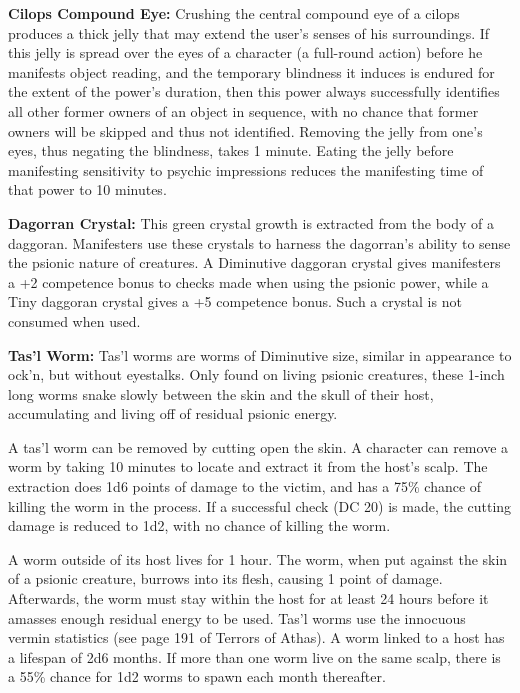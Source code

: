 \textbf{Cilops Compound Eye:} Crushing the central compound eye of a cilops produces a thick jelly that may extend the user's senses of his surroundings. If this jelly is spread over the eyes of a character (a full-round action) before he manifests object reading, and the temporary blindness it induces is endured for the extent of the power's duration, then this power always successfully identifies all other former owners of an object in sequence, with no chance that former owners will be skipped and thus not identified. Removing the jelly from one's eyes, thus negating the blindness, takes 1 minute. Eating the jelly before manifesting sensitivity to psychic impressions reduces the manifesting time of that power to 10 minutes.

\textbf{Dagorran Crystal:} This green crystal growth is extracted from the body of a daggoran. Manifesters use these crystals to harness the dagorran's ability to sense the psionic nature of creatures. A Diminutive daggoran crystal gives manifesters a +2 competence bonus to  checks made when using the  psionic power, while a Tiny daggoran crystal gives a +5 competence bonus. Such a crystal is not consumed when used.

\textbf{Tas'l Worm:} Tas'l worms are worms of Diminutive size, similar in appearance to ock'n, but without eyestalks. Only found on living psionic creatures, these 1-inch long worms snake slowly between the skin and the skull of their host, accumulating and living off of residual psionic energy.

A tas'l worm can be removed by cutting open the skin. A character can remove a worm by taking 10 minutes to locate and extract it from the host's scalp. The extraction does 1d6 points of damage to the victim, and has a 75\% chance of killing the worm in the process. If a successful  check (DC 20) is made, the cutting damage is reduced to 1d2, with no chance of killing the worm.

A worm outside of its host lives for 1 hour. The worm, when put against the skin of a psionic creature, burrows into its flesh, causing 1 point of damage. Afterwards, the worm must stay within the host for at least 24 hours before it amasses enough residual energy to be used. Tas'l worms use the innocuous vermin statistics (see page 191 of Terrors of Athas). A worm linked to a host has a lifespan of 2d6 months. If more than one worm live on the same scalp, there is a 55\% chance for 1d2 worms to spawn each month thereafter.

